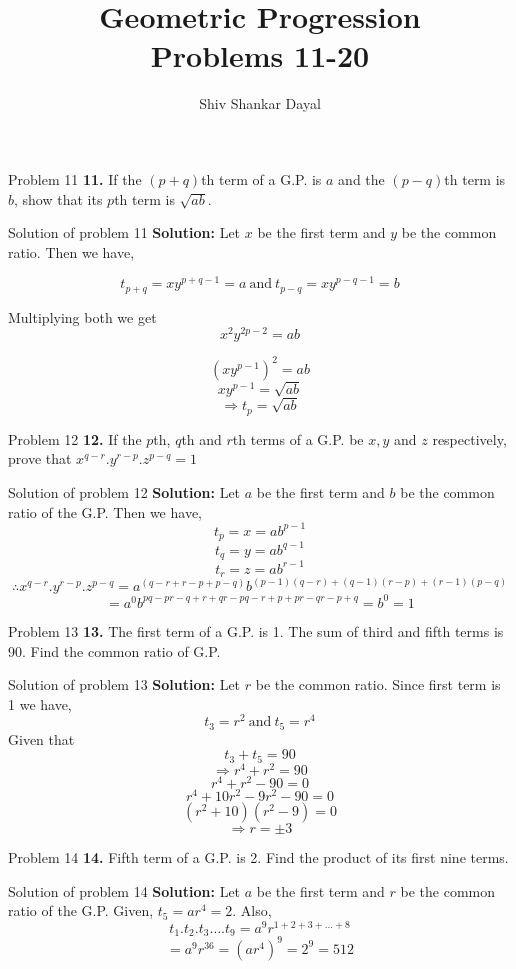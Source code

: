 \documentclass[aspectratio=1610,8pt]{beamer}
\title{Geometric Progression\\Problems 11-20}
\author[Shiv Shankar Dayal]{Shiv Shankar Dayal}
\begin{document}
\begin{frame}
       \titlepage
\end{frame}
\begin{frame}{Problem 11}
  \textbf{11.} If the $(p + q)$th term of a G.P. is $a$ and the $(p - q)$th
  term is $b$, show that its $p$th term is $\sqrt{ab}$.
\end{frame}
\begin{frame}{Solution of problem 11}
  \textbf{Solution:} Let $x$ be the first term and $y$ be the common
  ratio. Then we have,

  $$t_{p + q} = xy^{p + q - 1} = a~\text{and}~t_{p - q} = xy^{p - q -1} = b$$

  Multiplying both we get $$x^2y^{2p - 2} = ab$$
  
  $$(xy^{p - 1})^2 = ab$$
  $$ xy^{p - 1} = \sqrt{ab}$$
  $$\Rightarrow t_p = \sqrt{ab}$$
\end{frame}
\begin{frame}{Problem 12}
  \textbf{12.} If the $p$th, $q$th and $r$th terms of a G.P. be $x, y$ and $z$
  respectively, prove that $x^{q - r}.y^{r - p}.z^{p - q} = 1$
\end{frame}
\begin{frame}{Solution of problem 12}
  \textbf{Solution:} Let $a$ be the first term and $b$ be the common ratio of
  the G.P. Then we have,
  $$t_p = x = ab^{p - 1}$$
  $$t_q = y = ab^{q - 1}$$
  $$t_r = z = ab^{r - 1}$$
  $$\therefore x^{q - r}.y^{r - p}.z^{p - q} = a^{(q - r + r - p + p - q)}b^{(p -
    1)(q - r) + (q - 1)(r - p) + (r - 1)(p - q)}$$
  $$= a^0b^{pq - pr - q + r + qr - pq -r + p + pr - qr -p + q} = b^0 = 1$$
\end{frame}
\begin{frame}{Problem 13}
  \textbf{13.} The first term of a G.P. is 1. The sum of third and fifth terms
  is 90. Find the common ratio of G.P.
\end{frame}
\begin{frame}{Solution of problem 13}
  \textbf{Solution:} Let $r$ be the common ratio. Since first term is 1 we
  have,
  $$t_3 = r^2~\text{and}~t_5 = r^4$$
  Given that $$t_3 + t_5 = 90$$
  $$\Rightarrow r^4 + r^2 = 90$$
  $$r^4 + r^2 - 90 = 0$$
  $$r^4 + 10r^2 - 9r^2 -90 = 0$$
  $$(r^2 + 10)(r^2 - 9) = 0$$
  $$\Rightarrow r = \pm 3$$
\end{frame}
\begin{frame}{Problem 14}
  \textbf{14.} Fifth term of a G.P. is 2. Find the product of its first nine
  terms.
\end{frame}
\begin{frame}{Solution of problem 14}
  \textbf{Solution:} Let $a$ be the first term and $r$ be the common ratio of
  the G.P. Given, $t_5 = ar^4 = 2$. Also,
  $$t_1.t_2.t_3\ldots .t_9 = a^9r^{1 + 2 + 3 + \ldots + 8}$$
  $$= a^9r^{36} = (ar^4)^9 = 2^9 = 512$$
\end{frame}
\end{document}
